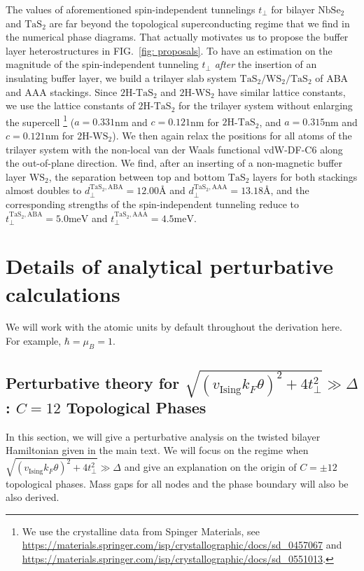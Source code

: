 \begin{subappendices}
	The values of aforementioned spin-independent tunnelings $t_\perp$ for bilayer $\mathrm{NbSe_2}$ and $\mathrm{TaS_2}$ are far beyond the topological superconducting regime that we find in the numerical phase diagrams. That actually motivates us to propose the buffer layer heterostructures in FIG.~\ref{fig: proposals}. To have an estimation on the magnitude of the spin-independent tunneling $t_\perp$ \emph{after} the insertion of an insulating buffer layer, we build a trilayer slab system $\mathrm{TaS_2}/\mathrm{WS_2}/\mathrm{TaS_2}$ of ABA and AAA stackings. Since $\mathrm{2H}$-$\mathrm{TaS_2}$ and $\mathrm{2H}$-$\mathrm{WS_2}$ have similar lattice constants, we use the lattice constants of $\mathrm{2H}$-$\mathrm{TaS_2}$ for the trilayer system without enlarging the supercell \footnote{We use the crystalline data from Spinger Materials, see \protect\url{https://materials.springer.com/isp/crystallographic/docs/sd_0457067} and \protect\url{https://materials.springer.com/isp/crystallographic/docs/sd_0551013}.} ($a=0.331$nm and $c=0.121$nm for $\mathrm{2H}$-$\mathrm{TaS_2}$, and $a=0.315$nm and $c=0.121$nm for $\mathrm{2H}$-$\mathrm{WS_2}$). We then again relax the positions for all atoms of the trilayer system with the non-local van der Waals functional vdW-DF-C6 \cite{tkatchenko2009accurate,berland2019van} along the out-of-plane direction. We find, after an inserting of a non-magnetic buffer layer $\mathrm{WS_2}$, the separation between top and bottom $\mathrm{TaS_2}$ layers for both stackings almost doubles to $d_\perp^{\mathrm{TaS_2},\text{ABA}}=12.00\text{\AA}$ and  $d_\perp^{\mathrm{TaS_2},\text{AAA}}=13.18\text{\AA}$, and the corresponding strengths of the spin-independent tunneling reduce to $t_\perp^{\mathrm{TaS_2},\text{ABA}}=5.0\mathrm{meV}$ and $t_\perp^{\mathrm{TaS_2},\text{AAA}}=4.5\mathrm{meV}$.


	\section{Details of analytical perturbative calculations}\label{app:analytical}
	We will work with the atomic units by default throughout the derivation here. For example, $\hbar=\mu_B=1$.
	\hfill\\
	\subsection{Perturbative theory for $\sqrt{(v_{\text{Ising}}k_F\theta)^2+4t_\perp^2}\gg \Delta $: $C=12$ Topological Phases}
	In this section, we will give a perturbative analysis on the twisted bilayer Hamiltonian given in the main text. We will focus on the regime when $\sqrt{(v_{\text{Ising}}k_F\theta)^2+4t_\perp^2}\gg \Delta $ and give an explanation on the origin of $C=\pm12$ topological phases. Mass gaps for all nodes and the phase boundary will also be also derived.

\end{subappendices}
